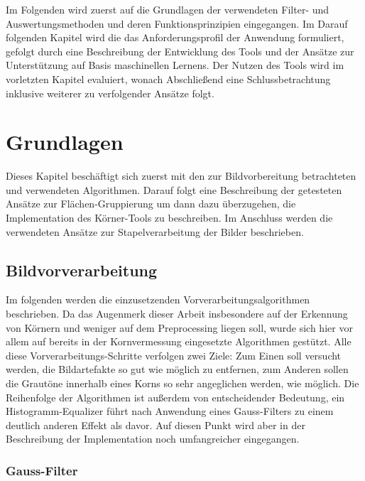 \documentclass[
  12pt,
]{book}
\begin{document}
Im Folgenden wird zuerst auf die Grundlagen der verwendeten Filter- und Auswertungsmethoden und deren Funktionsprinzipien eingegangen.
Im Darauf folgenden Kapitel wird die das Anforderungsprofil der Anwendung formuliert, gefolgt durch eine Beschreibung der Entwicklung des Tools und der Ansätze zur Unterstützung auf Basis maschinellen Lernens.
Der Nutzen des Tools wird im vorletzten Kapitel evaluiert, wonach Abschließend eine Schlussbetrachtung inklusive weiterer zu verfolgender Ansätze folgt.

\hypertarget{grundlagen}{%
\chapter{Grundlagen}\label{grundlagen}}

Dieses Kapitel beschäftigt sich zuerst mit den zur Bildvorbereitung betrachteten und verwendeten Algorithmen. Darauf folgt eine Beschreibung der getesteten Ansätze zur Flächen-Gruppierung um dann dazu überzugehen, die Implementation des Körner-Tools zu beschreiben.
Im Anschluss werden die verwendeten Ansätze zur Stapelverarbeitung der Bilder beschrieben.

\hypertarget{bildvorverarbeitung}{%
\section{Bildvorverarbeitung}\label{bildvorverarbeitung}}

Im folgenden werden die einzusetzenden Vorverarbeitungsalgorithmen beschrieben. Da das Augenmerk dieser Arbeit insbesondere auf der Erkennung von Körnern und weniger auf dem Preprocessing liegen soll, wurde sich hier vor allem auf bereits in der Kornvermessung eingesetzte Algorithmen gestützt.
Alle diese Vorverarbeitungs-Schritte verfolgen zwei Ziele:
Zum Einen soll versucht werden, die Bildartefakte so gut wie möglich zu entfernen, zum Anderen sollen die Grautöne innerhalb eines Korns so sehr angeglichen werden, wie möglich.
Die Reihenfolge der Algorithmen ist außerdem von entscheidender Bedeutung, ein Histogramm-Equalizer führt nach Anwendung eines Gauss-Filters zu einem deutlich anderen Effekt als davor. Auf diesen Punkt wird aber in der Beschreibung der Implementation noch umfangreicher eingegangen.

\hypertarget{gauss-filter}{%
\subsection{Gauss-Filter}\label{gauss-filter}}
\end{document}

